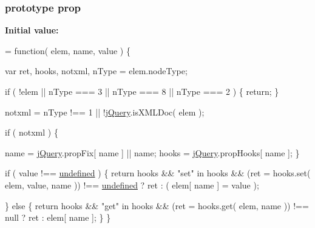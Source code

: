 \subsubsection[{prop}]{ {\bf prototype} prop}\label{jquery-1_810_82-vsdoc_8js_af17be84954030af6c2286f5da385d41b}
{\bfseries Initial value\+:}
\begin{DoxyCode}
= \textcolor{keyword}{function}( elem, name, value ) \{

        var ret, hooks, notxml,
            nType = elem.nodeType;

        
        \textcolor{keywordflow}{if} ( !elem || nType === 3 || nType === 8 || nType === 2 ) \{
            \textcolor{keywordflow}{return};
        \}

        notxml = nType !== 1 || !\hyperlink{jquery-1_810_82-vsdoc_8js_add5237586d970a38a81f990e8eb28c6c}{jQuery}.isXMLDoc( elem );

        \textcolor{keywordflow}{if} ( notxml ) \{
            
            name = \hyperlink{jquery-1_810_82-vsdoc_8js_add5237586d970a38a81f990e8eb28c6c}{jQuery}.propFix[ name ] || name;
            hooks = \hyperlink{jquery-1_810_82-vsdoc_8js_add5237586d970a38a81f990e8eb28c6c}{jQuery}.propHooks[ name ];
        \}

        \textcolor{keywordflow}{if} ( value !== \hyperlink{jquery-1_810_82-vsdoc_8js_a08113a236cc18d2a9d5ce27e638012be}{undefined} ) \{
            \textcolor{keywordflow}{return} hooks && \textcolor{stringliteral}{"set"} in hooks && (ret = hooks.set( elem, value, name )) !== 
      \hyperlink{jquery-1_810_82-vsdoc_8js_a08113a236cc18d2a9d5ce27e638012be}{undefined} ?
                ret :
                ( elem[ name ] = value );

        \} \textcolor{keywordflow}{else} \{
            \textcolor{keywordflow}{return} hooks && \textcolor{stringliteral}{"get"} in hooks && (ret = hooks.get( elem, name )) !== null ?
                ret :
                elem[ name ];
        \}
    \}
\end{DoxyCode}
\hypertarget{jquery-1_810_82-vsdoc_8js_acdf840d8414190fd915ee5b9cc2fb8c5}{}

